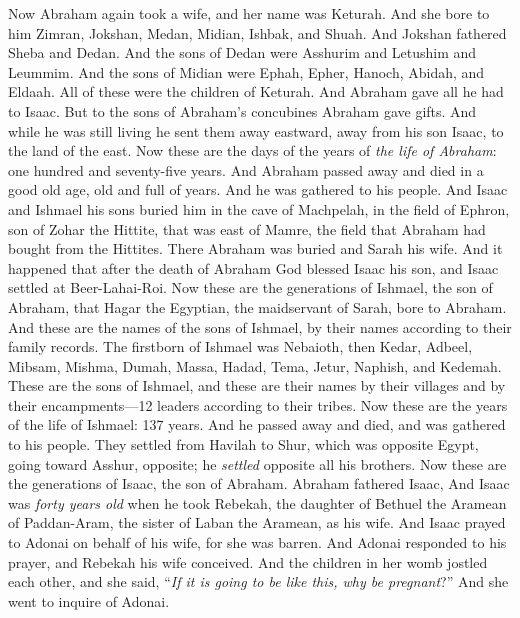 \begin{biblechapter} %
 Now Abraham again took a wife, and her name was Keturah.
\verse And she bore to him Zimran, Jokshan, Medan, Midian, Ishbak, and Shuah.
\verse And Jokshan fathered Sheba and Dedan. And the sons of Dedan were Asshurim and Letushim and Leummim.
\verse And the sons of Midian were Ephah, Epher, Hanoch, Abidah, and Eldaah. All of these were the children of Keturah.
\verse And Abraham gave all he had to Isaac.
\verse But to the sons of Abraham’s concubines Abraham gave gifts. And while he was still living he sent them away eastward, away from his son Isaac, to the land of the east.
\verse Now these are the days of the years of \textit{the life of Abraham}: one hundred and seventy-five years.
\verse And Abraham passed away and died in a good old age, old and full of years. And he was gathered to his people.
\verse And Isaac and Ishmael his sons buried him in the cave of Machpelah, in the field of Ephron, son of Zohar the Hittite, that was east of Mamre,
\verse the field that Abraham had bought from the Hittites. There Abraham was buried and Sarah his wife.
\verse And it happened that after the death of Abraham God blessed Isaac his son, and Isaac settled at Beer-Lahai-Roi.
\verse Now these are the generations of Ishmael, the son of Abraham, that Hagar the Egyptian, the maidservant of Sarah, bore to Abraham.
\verse And these are the names of the sons of Ishmael, by their names according to their family records. The firstborn of Ishmael was Nebaioth, then Kedar, Adbeel, Mibsam,
\verse Mishma, Dumah, Massa,
\verse Hadad, Tema, Jetur, Naphish, and Kedemah.
\verse These are the sons of Ishmael, and these are their names by their villages and by their encampments—12 leaders according to their tribes.
\verse Now these are the years of the life of Ishmael: 137 years. And he passed away and died, and was gathered to his people.
\verse They settled from Havilah to Shur, which was opposite Egypt, going toward Asshur, opposite; he \textit{settled} opposite all his brothers.
 Now these are the generations of Isaac, the son of Abraham. Abraham fathered Isaac,
\verse And Isaac was \textit{forty years old} when he took Rebekah, the daughter of Bethuel the Aramean of Paddan-Aram, the sister of Laban the Aramean, as his wife.
\verse And Isaac prayed to Adonai on behalf of his wife, for she was barren. And Adonai responded to his prayer, and Rebekah his wife conceived.
\verse And the children in her womb jostled each other, and she said, “\textit{If it is going to be like this, why be pregnant}?” And she went to inquire of Adonai.

\end{biblechapter}
